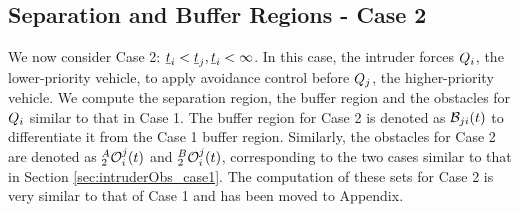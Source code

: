 \subsection{Separation and Buffer Regions - Case 2} \label{sec:case2_maintext}
We now consider Case 2: $\underline{t}_i < \underline{t}_j, \underline{t}_i <\infty$. In this case, the intruder forces $Q_i$, the lower-priority vehicle, to apply avoidance control before $Q_j$, the higher-priority vehicle.  We compute the separation region, the buffer region and the obstacles for $Q_i$ similar to that in Case 1. The buffer region for Case 2 is denoted as $\mathcal{B}_{ji}(t)$ to differentiate it from the Case 1 buffer region. Similarly, the obstacles for Case 2 are denoted as $_2^A\mathcal{O}_i^j(t)$ and $_2^B\mathcal{O}_i^j(t)$, corresponding to the two cases similar to that in Section \eqref{sec:intruderObs_case1}. The computation of these sets for Case 2 is very similar to that of Case 1 and has been moved to Appendix.  

